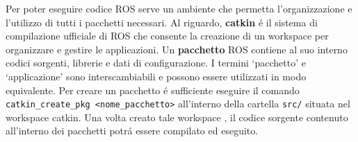 Per poter eseguire codice ROS serve un ambiente che permetta l'organizzazione e l'utilizzo di tutti i pacchetti necessari. 
Al riguardo, \textbf{catkin} \'{e} il sistema di compilazione ufficiale di ROS che consente la creazione di un workspace per 
organizzare e gestire le applicazioni. 
Un \textbf{pacchetto} ROS contiene al suo interno codici sorgenti, librerie e dati di configurazione. 
I termini `pacchetto' e `applicazione' sono interscambiabili e possono essere utilizzati in modo equivalente.
Per creare un pacchetto \'{e} sufficiente eseguire il comando 
\verb|catkin_create_pkg <nome_pacchetto>| all'interno della cartella \verb|src/| situata nel workspace catkin.
Una volta creato tale workspace \cite{catkin_ws}, il codice sorgente contenuto all'interno dei pacchetti potr\'{a} essere 
compilato ed eseguito.
